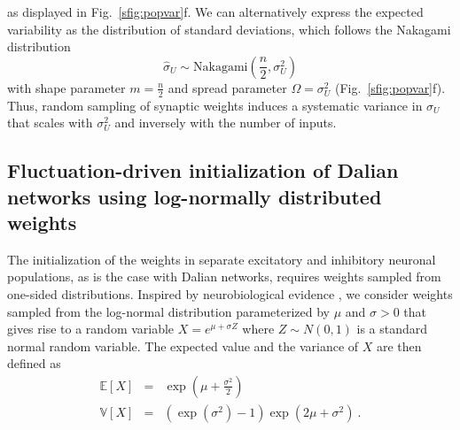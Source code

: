 \documentclass[11pt,a4paper]{article}
\begin{document}
\begin{refsection}
\begin{equation}
\end{equation}
as displayed in Fig.~\ref{sfig:popvar}f.
We can alternatively express the expected variability as the distribution of standard deviations, which follows the Nakagami distribution \citep{Huang2016}
\begin{equation}
    \hat \sigma_U \sim \mathrm{Nakagami}\left(\frac{n}{2}, \sigma_U^2 \right)  
\end{equation}
with shape parameter $m=\frac{n}{2}$ and spread parameter $\Omega=\sigma_U^2$ (Fig.~\ref{sfig:popvar}f). 
Thus, random sampling of synaptic weights induces a systematic variance in $\sigma_U$ that scales with $\sigma_U^2$ and inversely with the number of inputs.


\clearpage


\subsection{Fluctuation-driven initialization of Dalian networks using log-normally distributed weights}
\label{sec:lognormal}

The initialization of the weights in separate excitatory and inhibitory neuronal populations, as is the case with Dalian networks, requires weights sampled from one-sided distributions. 
Inspired by neurobiological evidence \citep{buzsaki_log-dynamic_2014}, we consider weights sampled from the log-normal distribution parameterized by $\mu$ and $\sigma>0$ that gives rise to a random variable $X = e^{\mu + \sigma Z}$ where $Z \sim N(0, 1)$ is a standard normal random variable. The expected value and the variance of $X$ are then defined as
\begin{eqnarray}
    \mathbb{E}[X] &=& \exp\left(\mu + \frac{\sigma^2}{2}\right)\\
    \mathbb{V}[X] &=& \left(\exp\left(\sigma^2 \right) - 1 \right) \exp\left(2\mu+\sigma^2\right)~.
\end{eqnarray}
    

\end{refsection}
\end{document}
